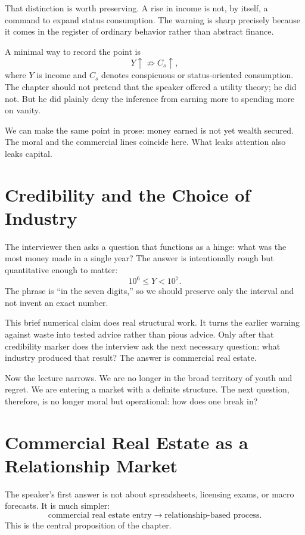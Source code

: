 That distinction is worth preserving. A rise in income is not, by itself, a command to expand status consumption. The warning is sharp precisely because it comes in the register of ordinary behavior rather than abstract finance.

A minimal way to record the point is
\begin{equation}
Y \uparrow \not\Rightarrow C_s \uparrow,
\end{equation}
where \(Y\) is income and \(C_s\) denotes conspicuous or status-oriented consumption. The chapter should not pretend that the speaker offered a utility theory; he did not. But he did plainly deny the inference from earning more to spending more on vanity.

We can make the same point in prose: money earned is not yet wealth secured. The moral and the commercial lines coincide here. What leaks attention also leaks capital.

\section{Credibility and the Choice of Industry}

The interviewer then asks a question that functions as a hinge: what was the most money made in a single year? The answer is intentionally rough but quantitative enough to matter:
\begin{equation}
10^6 \le Y < 10^7.
\end{equation}
The phrase is ``in the seven digits,'' so we should preserve only the interval and not invent an exact number.

This brief numerical claim does real structural work. It turns the earlier warning against waste into tested advice rather than pious advice. Only after that credibility marker does the interview ask the next necessary question: what industry produced that result? The answer is commercial real estate.

Now the lecture narrows. We are no longer in the broad territory of youth and regret. We are entering a market with a definite structure. The next question, therefore, is no longer moral but operational: how does one break in?

\section{Commercial Real Estate as a Relationship Market}

The speaker's first answer is not about spreadsheets, licensing exams, or macro forecasts. It is much simpler:
\begin{equation}
\text{commercial real estate entry} \to \text{relationship-based process}.
\end{equation}
This is the central proposition of the chapter.

